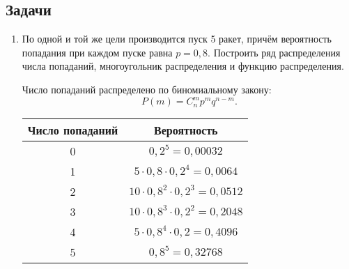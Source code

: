 \subsection{Задачи}
    \begin{enumerate}
        \item По одной и той же цели производится пуск 5 ракет, причём
            вероятность попадания при каждом пуске равна \( p = 0,8 \).
            Построить ряд распределения числа попаданий, многоугольник
            распределения и функцию распределения.

            Число попаданий распределено по биномиальному закону:
            \[
                P(m) = C_n^m p^m q^{n-m}.
            \]
            \begin{table}[h!]
                \center
                \begin{tabular}{|c|c|} \hline
                    Число попаданий & Вероятность \\ \hline
                    0 & \( 0,2^5 = 0,00032 \) \\
                    1 & \( 5 \cdot 0,8 \cdot 0,2^4 = 0,0064 \) \\
                    2 & \( 10 \cdot 0,8^2 \cdot 0,2^3 = 0,0512 \) \\
                    3 & \( 10 \cdot 0,8^3 \cdot 0,2^2 = 0,2048 \) \\
                    4 & \( 5 \cdot 0,8^4 \cdot 0,2 = 0,4096 \) \\
                    5 & \( 0,8^5 = 0,32768 \) \\ \hline
                \end{tabular}
            \end{table}
            \begin{figure}[h]
                \center
\end{figure}
\end{enumerate}
